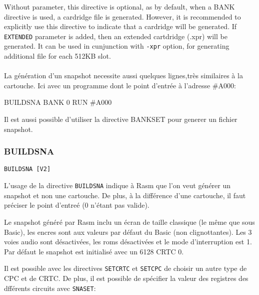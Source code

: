 \begin{xen}
Without parameter, this directive is optional, as by default, when a BANK directive is used, a cardridge file is generated. However, it is recommended to explicitly use this directive to indicate that a cardridge will be generated.
If \texttt{EXTENDED} parameter is added, then an extended cartdridge (.xpr) will be generated.
It can be used in cunjunction with \texttt{-xpr} option, for generating additional file for each 512KB slot.
\end{xen}

\paragraph{}

\begin{xfr}
La génération d'un snapshot necessite aussi quelques lignes,très similaires à la cartouche. Ici avec un programme dont le point d'entrée à l'adresse \#A000:
\end{xfr}

\begin{xen}
\end{xen}

\begin{code}
BUILDSNA
BANK 0
RUN \#A000
\end{code}

\begin{xfr}
Il est aussi possible d'utiliser la directive BANKSET pour generer un fichier snapshot.
\end{xfr}

\subsubsection{BUILDSNA}
\begin{verbatim}
BUILDSNA [V2]
\end{verbatim}

\begin{xfr}
L'usage de la directive \texttt{BUILDSNA} indique à Rasm que l'on veut générer un snapshot et non une cartouche.  De plus, à la différence d'une cartouche, il faut préciser le point d'entreé (0 n'étant pas valide).

Le snapshot généré par Rasm inclu un écran de taille classique (le même que sous Basic), les encres sont aux valeurs par défaut du Basic (non clignottantes). Les 3 voies audio sont désactivées, les roms désactivées et le mode d'interruption est 1.
Par défaut le snapshot est initialisé avec un 6128 CRTC 0.

Il est possible avec les directives \texttt{SETCRTC} et \texttt{SETCPC} de choisir un autre type de CPC et de CRTC.
De plus, il est possible de spécifier la valeur des registres des dfférents circuits avec \texttt{SNASET}:
\end{xfr}

